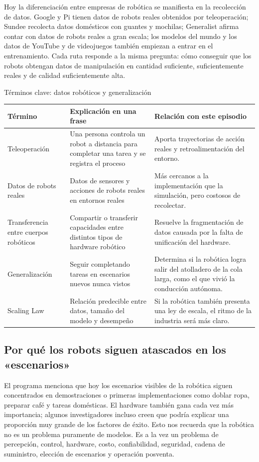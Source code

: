 \documentclass[a4paper]{article}
\begin{document}
Hoy la diferenciación entre empresas de robótica se manifiesta en la recolección de datos. Google y Pi tienen datos de robots reales obtenidos por teleoperación; Sundee recolecta datos domésticos con guantes y mochilas; Generalist afirma contar con datos de robots reales a gran escala; los modelos del mundo y los datos de YouTube y de videojuegos también empiezan a entrar en el entrenamiento. Cada ruta responde a la misma pregunta: cómo conseguir que los robots obtengan datos de manipulación en cantidad suficiente, suficientemente reales y de calidad suficientemente alta.

\begin{knowledgebox}{Términos clave: datos robóticos y generalización}
\begin{tabularx}{\textwidth}{p{}p{}X}
\toprule
Término & Explicación en una frase & Relación con este episodio \\
\midrule
Teleoperación & Una persona controla un robot a distancia para completar una tarea y se registra el proceso & Aporta trayectorias de acción reales y retroalimentación del entorno. \\
Datos de robots reales & Datos de sensores y acciones de robots reales en entornos reales & Más cercanos a la implementación que la simulación, pero costosos de recolectar. \\
Transferencia entre cuerpos robóticos & Compartir o transferir capacidades entre distintos tipos de hardware robótico & Resuelve la fragmentación de datos causada por la falta de unificación del hardware. \\
Generalización & Seguir completando tareas en escenarios nuevos nunca vistos & Determina si la robótica logra salir del atolladero de la cola larga, como el que vivió la conducción autónoma. \\
Scaling Law & Relación predecible entre datos, tamaño del modelo y desempeño & Si la robótica también presenta una ley de escala, el ritmo de la industria será más claro. \\
\bottomrule
\end{tabularx}
\end{knowledgebox}

\subsection{Por qué los robots siguen atascados en los «escenarios»}

El programa menciona que hoy los escenarios visibles de la robótica siguen concentrados en demostraciones o primeras implementaciones como doblar ropa, preparar café y tareas domésticas. El hardware también gana cada vez más importancia; algunos investigadores incluso creen que podría explicar una proporción muy grande de los factores de éxito. Esto nos recuerda que la robótica no es un problema puramente de modelos. Es a la vez un problema de percepción, control, hardware, costo, confiabilidad, seguridad, cadena de suministro, elección de escenarios y operación posventa.
\end{document}
